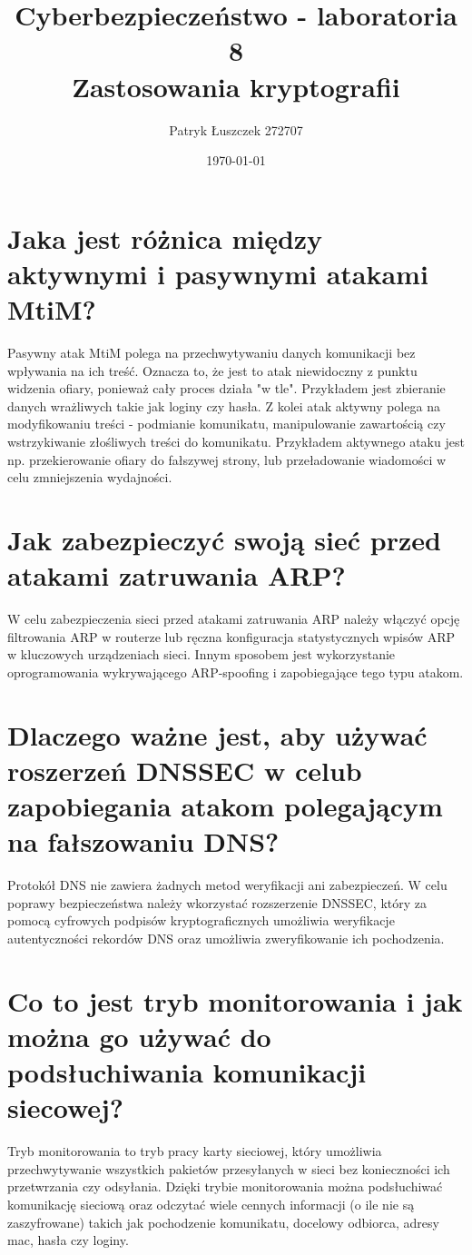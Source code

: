 \documentclass{article}
\title{%
  Cyberbezpieczeństwo - laboratoria 8 \\
  \large Zastosowania kryptografii}
\author{Patryk Łuszczek 272707}
\date{\today}
\begin{document}
\maketitle
\newpage

\section{Jaka jest różnica między aktywnymi i pasywnymi atakami MtiM?}
Pasywny atak MtiM polega na przechwytywaniu danych komunikacji bez wpływania na ich treść. Oznacza to, że jest to atak niewidoczny z punktu widzenia ofiary, ponieważ cały proces działa "w tle". Przykładem jest zbieranie danych wrażliwych takie jak loginy czy hasła.
Z kolei atak aktywny polega na modyfikowaniu treści - podmianie komunikatu, manipulowanie zawartością czy wstrzykiwanie złośliwych treści do komunikatu. Przykładem aktywnego ataku jest np. przekierowanie ofiary do fałszywej strony, lub przeładowanie wiadomości w celu zmniejszenia wydajności.
\section{Jak zabezpieczyć swoją sieć przed atakami zatruwania ARP?}
W celu zabezpieczenia sieci przed atakami zatruwania ARP należy włączyć opcję filtrowania ARP w routerze lub ręczna konfiguracja statystycznych wpisów ARP w kluczowych urządzeniach sieci.
Innym sposobem jest wykorzystanie oprogramowania wykrywającego ARP-spoofing i zapobiegające tego typu atakom.
\section{Dlaczego ważne jest, aby używać roszerzeń DNSSEC w celub zapobiegania atakom polegającym na fałszowaniu DNS?}
Protokół DNS nie zawiera żadnych metod weryfikacji ani zabezpieczeń. W celu poprawy bezpieczeństwa należy wkorzystać rozszerzenie DNSSEC, który za pomocą
cyfrowych podpisów kryptograficznych umożliwia weryfikacje autentyczności rekordów DNS oraz umożliwia zweryfikowanie ich pochodzenia.
\section{Co to jest tryb monitorowania i jak można go używać do podsłuchiwania komunikacji siecowej?}
Tryb monitorowania to tryb pracy karty sieciowej, który umożliwia przechwytywanie wszystkich pakietów przesyłanych w sieci bez konieczności ich przetwrzania czy odsyłania.
Dzięki trybie monitorowania można podsłuchiwać komunikację sieciową oraz odczytać wiele cennych informacji (o ile nie są zaszyfrowane) takich jak pochodzenie komunikatu, docelowy odbiorca, adresy mac, hasła czy loginy.
\end{document}
